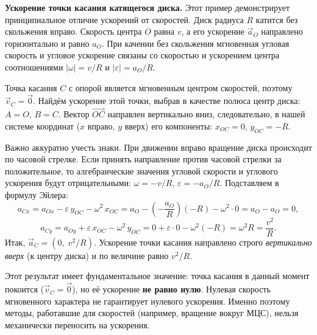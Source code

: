 \documentclass[../main.tex]{subfiles}
\begin{document}
\begin{example}
\textbf{Ускорение точки касания катящегося диска.} Этот пример демонстрирует принципиальное отличие ускорений от скоростей. Диск радиуса $R$ катится без скольжения вправо. Скорость центра $O$ равна $v$, а его ускорение $\vec{a}_O$ направлено горизонтально и равно $a_O$. При качении без скольжения мгновенная угловая скорость и угловое ускорение связаны со скоростью и ускорением центра соотношениями $|\omega| = v/R$ и $|\varepsilon| = a_O/R$.

Точка касания $C$ с опорой является мгновенным центром скоростей, поэтому $\vec{v}_C = \vec{0}$. Найдём ускорение этой точки, выбрав в качестве полюса центр диска: $A = O$, $B = C$. Вектор $\overrightarrow{OC}$ направлен вертикально вниз, следовательно, в нашей системе координат ($x$ вправо, $y$ вверх) его компоненты: $x_{OC} = 0$, $y_{OC} = -R$.

Важно аккуратно учесть знаки. При движении вправо вращение диска происходит по часовой стрелке. Если принять направление против часовой стрелки за положительное, то алгебраические значения угловой скорости и углового ускорения будут отрицательными: $\omega = -v/R$, $\varepsilon = -a_O/R$. Подставляем в формулу Эйлера:
\[
a_{Cx} = a_{Ox} - \varepsilon\, y_{OC} - \omega^2\, x_{OC}
= a_O - \left(-\frac{a_O}{R}\right)(-R) - \omega^2\cdot 0
= a_O - a_O = 0,
\]
\[
a_{Cy} = a_{Oy} + \varepsilon\, x_{OC} - \omega^2\, y_{OC}
= 0 + \varepsilon\cdot 0 - \omega^2(-R)
= \omega^2 R = \frac{v^2}{R}.
\]
Итак, $\vec{a}_C = (0,\; v^2/R)$. Ускорение точки касания направлено строго \textit{вертикально вверх} (к центру диска) и по величине равно $v^2/R$.

Этот результат имеет фундаментальное значение: точка касания в данный момент покоится ($\vec{v}_C = \vec{0}$), но её ускорение \textbf{не равно нулю}. Нулевая скорость мгновенного характера не гарантирует нулевого ускорения. Именно поэтому методы, работавшие для скоростей (например, вращение вокруг МЦС), нельзя механически переносить на ускорения.
\end{example}
\end{document}
